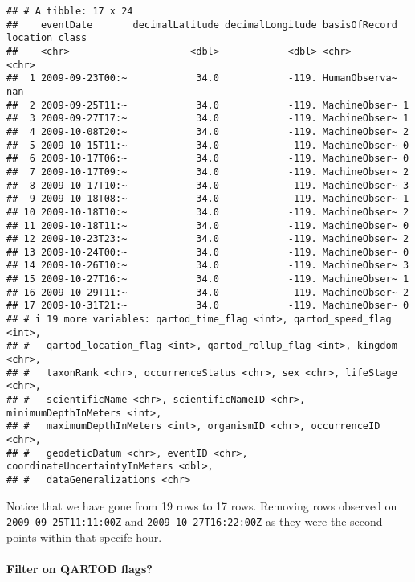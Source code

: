 \documentclass[
]{book}
\begin{document}
\begin{verbatim}
## # A tibble: 17 x 24
##    eventDate       decimalLatitude decimalLongitude basisOfRecord location_class
##    <chr>                     <dbl>            <dbl> <chr>         <chr>         
##  1 2009-09-23T00:~            34.0            -119. HumanObserva~ nan           
##  2 2009-09-25T11:~            34.0            -119. MachineObser~ 1             
##  3 2009-09-27T17:~            34.0            -119. MachineObser~ 1             
##  4 2009-10-08T20:~            34.0            -119. MachineObser~ 2             
##  5 2009-10-15T11:~            34.0            -119. MachineObser~ 0             
##  6 2009-10-17T06:~            34.0            -119. MachineObser~ 0             
##  7 2009-10-17T09:~            34.0            -119. MachineObser~ 2             
##  8 2009-10-17T10:~            34.0            -119. MachineObser~ 3             
##  9 2009-10-18T08:~            34.0            -119. MachineObser~ 1             
## 10 2009-10-18T10:~            34.0            -119. MachineObser~ 2             
## 11 2009-10-18T11:~            34.0            -119. MachineObser~ 0             
## 12 2009-10-23T23:~            34.0            -119. MachineObser~ 2             
## 13 2009-10-24T00:~            34.0            -119. MachineObser~ 0             
## 14 2009-10-26T10:~            34.0            -119. MachineObser~ 3             
## 15 2009-10-27T16:~            34.0            -119. MachineObser~ 1             
## 16 2009-10-29T11:~            34.0            -119. MachineObser~ 2             
## 17 2009-10-31T21:~            34.0            -119. MachineObser~ 0             
## # i 19 more variables: qartod_time_flag <int>, qartod_speed_flag <int>,
## #   qartod_location_flag <int>, qartod_rollup_flag <int>, kingdom <chr>,
## #   taxonRank <chr>, occurrenceStatus <chr>, sex <chr>, lifeStage <chr>,
## #   scientificName <chr>, scientificNameID <chr>, minimumDepthInMeters <int>,
## #   maximumDepthInMeters <int>, organismID <chr>, occurrenceID <chr>,
## #   geodeticDatum <chr>, eventID <chr>, coordinateUncertaintyInMeters <dbl>,
## #   dataGeneralizations <chr>
\end{verbatim}

Notice that we have gone from 19 rows to 17 rows. Removing rows observed on \texttt{2009-09-25T11:11:00Z} and \texttt{2009-10-27T16:22:00Z} as they were the second points within that specifc hour.

\hypertarget{filter-on-qartod-flags}{%
\paragraph{Filter on QARTOD flags?}\label{filter-on-qartod-flags}}
\end{document}

